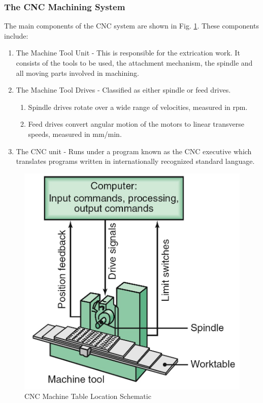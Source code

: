 \subsubsection{The CNC Machining System}
The main components of the CNC system are shown in Fig. \ref{fig:cnc}. These components include:
\begin{enumerate}
	\item The Machine Tool Unit - This is responsible for the extrication work. It consists of the tools to be used, the attachment mechanism, the spindle and all moving parts involved in machining.
	\item The Machine Tool Drives - Classified as either spindle or feed drives. \begin{enumerate}
		\item Spindle drives rotate over a wide range of velocities, measured in rpm.
		\item Feed drives convert angular motion of the motors to linear transverse speeds, measured in mm/min.
	\end{enumerate}
	\item The CNC unit - Runs under a program known as the CNC executive which translates programs written in internationally recognized standard language.
\end{enumerate}
\begin{figure}[h!]
	\centering
	\includegraphics[width=0.8\linewidth]{Figures/cncschematic}
	\caption[CNC Machining System Schematic]{CNC Machine Table Location Schematic \cite{Kalpakjian2010}}
	\label{fig:cnc}
\end{figure}
